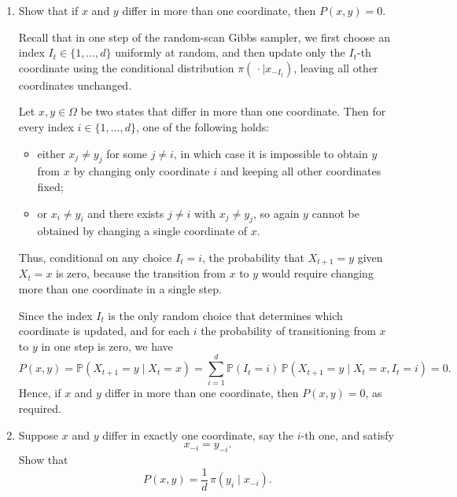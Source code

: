 \documentclass[answers,12pt,addpoints]{exam}
\begin{document}
\begin{enumerate}
\item Show that if $x$ and $y$ differ in more than one coordinate, then $P(x,y) = 0$.
\begin{solution}
Recall that in one step of the random-scan Gibbs sampler, we first choose an index
$I_t \in \{1,\dots,d\}$ uniformly at random, and then update only the $I_t$-th
coordinate using the conditional distribution $\pi(\,\cdot \mid x_{-I_t})$,
leaving all other coordinates unchanged.

Let $x,y \in \Omega$ be two states that differ in more than one coordinate.
Then for every index $i \in \{1,\dots,d\}$, one of the following holds:
\begin{itemize}
\item either $x_j \neq y_j$ for some $j \neq i$, in which case it is impossible
to obtain $y$ from $x$ by changing only coordinate $i$ and keeping all other
coordinates fixed;
\item or $x_i \neq y_i$ and there exists $j \neq i$ with $x_j \neq y_j$, so again
$y$ cannot be obtained by changing a single coordinate of $x$.
\end{itemize}
Thus, conditional on any choice $I_t = i$, the probability that $X_{t+1} = y$
given $X_t = x$ is zero, because the transition from $x$ to $y$ would require
changing more than one coordinate in a single step.

Since the index $I_t$ is the only random choice that determines which coordinate
is updated, and for each $i$ the probability of transitioning from $x$ to $y$ in
one step is zero, we have
\[
P(x,y) = \mathbb{P}(X_{t+1} = y \mid X_t = x)
= \sum_{i=1}^d \mathbb{P}(I_t = i)\,
\mathbb{P}(X_{t+1} = y \mid X_t = x, I_t = i)
= 0.
\]
Hence, if $x$ and $y$ differ in more than one coordinate, then $P(x,y) = 0$, as
required.
\end{solution}
\item Suppose $x$ and $y$ differ in exactly one coordinate, say the $i$-th one, and satisfy
\[
x_{-i} = y_{-i}.
\]
Show that
\[
P(x,y) = \frac{1}{d}\,\pi(y_i \mid x_{-i}).
\]


\end{enumerate}
\end{document}
